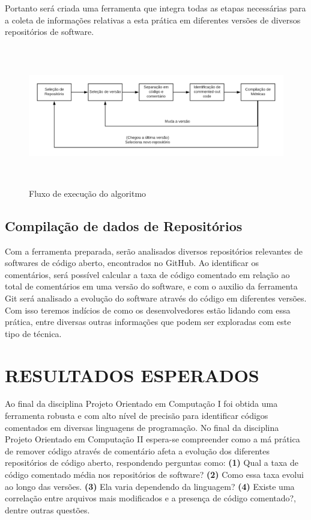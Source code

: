\documentclass{abnt}
\begin{document}
Portanto será criada uma ferramenta que integra todas as etapas necessárias para
a coleta de informações relativas a esta prática em diferentes versões de diversos 
repositórios de software.

\begin{figure}[h!]
  \centering
  \includegraphics[height=2.4in,width=6.3in]{../images/pipeline-flow.png}
  \caption{Fluxo de execução do algoritmo}
  \label{fig:commentExample}
\end{figure}


\section{Compilação de dados de Repositórios}

Com a ferramenta preparada, serão analisados 
diversos repositórios relevantes de softwares de código aberto, encontrados
no GitHub. Ao identificar os comentários, será possível calcular a taxa de 
código comentado em relação ao total de comentários em uma versão do 
software, e com o auxilio da ferramenta Git será analisado a evolução do 
software através do código em diferentes versões. Com isso teremos 
indícios de como os desenvolvedores estão lidando com essa prática, entre 
diversas outras informações que podem ser exploradas com este tipo
de técnica.

\chapter{RESULTADOS ESPERADOS}

Ao final da disciplina Projeto Orientado em Computação I  foi
obtida uma ferramenta robusta e com alto nível de precisão para identificar 
códigos comentados em diversas linguagens de programação. No final da 
disciplina Projeto Orientado em Computação II espera-se compreender como a 
má prática de remover código através de comentário afeta a evolução dos 
diferentes repositórios de código aberto, respondendo perguntas como:
\textbf{(1)} Qual a taxa de código comentado média nos repositórios de software?
\textbf{(2)} Como essa taxa evolui ao longo das versões.
\textbf{(3)} Ela varia dependendo da linguagem?
\textbf{(4)} Existe uma correlação entre arquivos mais modificados e a presença de 
    código comentado?,
dentre outras questões.
\end{document}
